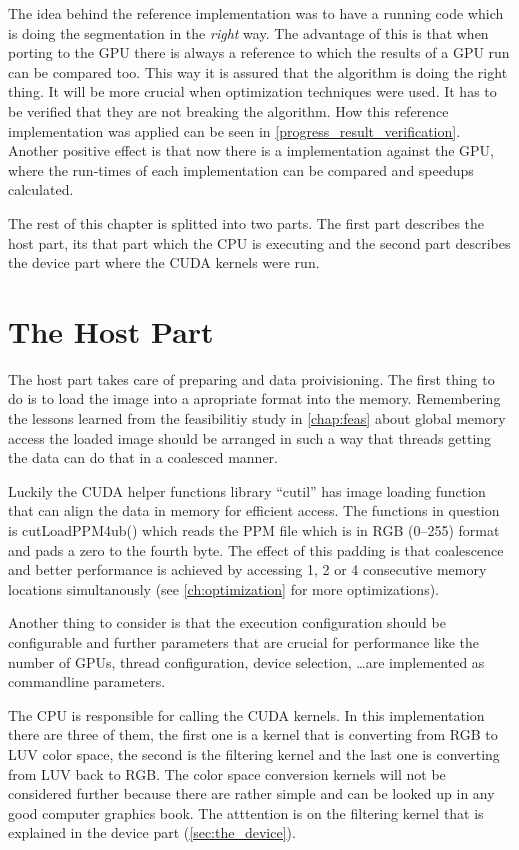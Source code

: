 The idea behind the reference implementation was to have a running code which is
doing the segmentation in the \emph{right} way. The advantage of this is that
when porting to the \gls{GPU} there is always a reference to which the results
of a \gls{GPU} run can be compared too. This way it is assured that the
algorithm is doing the right thing. It will be more crucial when optimization
techniques were used. It has to be verified that they are not breaking the
algorithm. How this reference implementation was applied can be seen in 
\autoref{progress_result_verification}. Another positive effect is that now
there is a implementation against the \gls{GPU}, where the run-times of each
implementation can be compared and speedups calculated. 

The rest of this chapter is splitted into two parts. The first part describes
the host part, its that part which the \gls{CPU} is executing and the second
part describes the device part where the \gls{CUDA} kernels were run. 


\section{The Host Part} %
\label{sec:the_host}
The host part takes care of preparing and data proivisioning. The first thing
to do is to load the image into a apropriate format into the memory. Remembering
the lessons learned from the feasibilitiy study in \autoref{chap:feas} about
global memory access the loaded image should be arranged in such a way that
threads getting the data can do that in a coalesced manner. 

Luckily the \gls{CUDA} helper functions library ``cutil'' has image loading
function that can align the data in memory for efficient access. The functions
in question is \textsf{cutLoadPPM4ub()} which reads the \gls{PPM} file which is
in \gls{RGB} (0--255) format and pads a zero to the fourth byte. The effect of
this padding is that coalescence and better performance is achieved by accessing
1, 2 or 4 consecutive memory locations simultanously (see \autoref{ch:optimization}
for more optimizations).

Another thing to consider is that the execution configuration should be configurable
and further parameters that are crucial for performance like the number of 
\glspl{GPU}, thread configuration, device selection, \ldots are implemented as 
commandline parameters. 

The \gls{CPU} is responsible for calling the \gls{CUDA} kernels. In this 
implementation there are three of them, the first one is a kernel that is
converting from \gls{RGB} to \gls{LUV} color space, the second is the filtering kernel
and the last one is converting from \gls{LUV} back to \gls{RGB}. The color space
conversion kernels will not be considered further because there are rather simple
and can be looked up in any good computer graphics book. The atttention is on 
the filtering kernel that is explained in the device part (\autoref{sec:the_device}).

